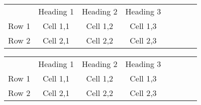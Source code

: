 \documentclass{article}
\begin{document}
\begin{sidewaystable}
\small
\begin{longtable}{|c|c|c|c|c|c|c|c|}
\multicolumn{1}{r}{}
& \multicolumn{1}{l}{Heading 1}
& \multicolumn{1}{l}{Heading 2}
& \multicolumn{1}{l}{Heading 3} \\ \cline{2-4}
Row 1 & Cell 1,1 & Cell 1,2 & Cell 1,3 \\
Row 2 & Cell 2,1 & Cell 2,2 & Cell 2,3
\end{longtable}
\end{sidewaystable}


\begin{landscape}  
\begin{longtable}{|c|c|c|c|c|c|c|c|}
\multicolumn{1}{r}{}
& \multicolumn{1}{l}{Heading 1}
& \multicolumn{1}{l}{Heading 2}
& \multicolumn{1}{l}{Heading 3} \\ \cline{2-4}
Row 1 & Cell 1,1 & Cell 1,2 & Cell 1,3 \\
Row 2 & Cell 2,1 & Cell 2,2 & Cell 2,3
\end{longtable}
\end{landscape}

\end{document}
